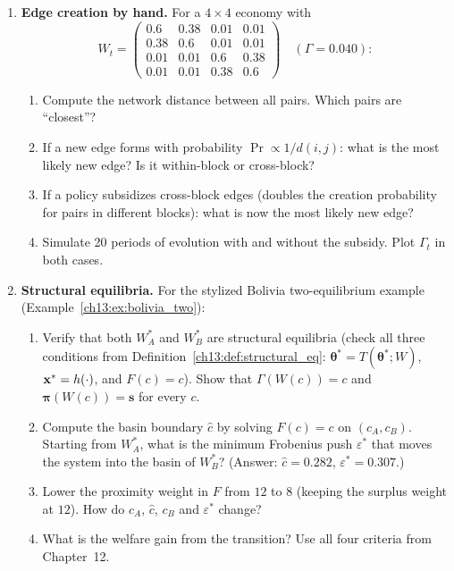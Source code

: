 \documentclass[../structural_economics_book.tex]{subfiles}
\begin{document}
\begin{enumerate}[label=\textbf{13.\arabic*}, leftmargin=3em]

\item \textbf{Edge creation by hand.} For a $4 \times 4$ economy with
\[
W_t = \begin{pmatrix} 0.6 & 0.38 & 0.01 & 0.01 \\ 0.38 & 0.6 & 0.01 & 0.01 \\ 0.01 & 0.01 & 0.6 & 0.38 \\ 0.01 & 0.01 & 0.38 & 0.6 \end{pmatrix} \quad (\Gamma = 0.040):
\]
\begin{enumerate}
\item Compute the network distance between all pairs. Which pairs are ``closest''?
\item If a new edge forms with probability $\Pr \propto 1/d(i,j)$: what is the most likely new edge? Is it within-block or cross-block?
\item If a policy subsidizes cross-block edges (doubles the creation probability for pairs in different blocks): what is now the most likely new edge?
\item Simulate 20 periods of evolution with and without the subsidy. Plot $\Gamma_t$ in both cases.
\end{enumerate}

\item \textbf{Structural equilibria.} For the stylized Bolivia two-equilibrium example (Example~\ref{ch13:ex:bolivia_two}):
\begin{enumerate}
\item Verify that both $W^*_A$ and $W^*_B$ are structural equilibria (check all three conditions from Definition~\ref{ch13:def:structural_eq}: $\boldsymbol{\theta}^* = T(\boldsymbol{\theta}^*; W)$, $\mathbf{x}^* = h(\cdot)$, and $F(c) = c$). Show that $\Gamma(W(c)) = c$ and $\boldsymbol{\pi}(W(c)) = \mathbf{s}$ for every $c$.
\item Compute the basin boundary $\hat c$ by solving $F(c) = c$ on $(c_A, c_B)$. Starting from $W^*_A$, what is the minimum Frobenius push $\varepsilon^*$ that moves the system into the basin of $W^*_B$? (Answer: $\hat c = 0.282$, $\varepsilon^* = 0.307$.)
\item Lower the proximity weight in $F$ from $12$ to $8$ (keeping the surplus weight at $12$). How do $c_A$, $\hat c$, $c_B$ and $\varepsilon^*$ change?
\item What is the welfare gain from the transition? Use all four criteria from Chapter~12.
\end{enumerate}


\end{enumerate}
\end{document}
